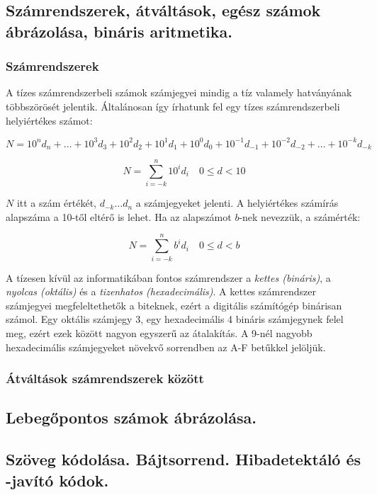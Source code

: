 \documentclass[a4paper]{article}
\begin{document}
\subsection{Számrendszerek, átváltások, egész számok ábrázolása, bináris aritmetika.}

\subsubsection{Számrendszerek}

A tízes számrendszerbeli számok számjegyei mindig a tíz valamely hatványának többszörösét jelentik. Általánosan így írhatunk fel egy tízes számrendszerbeli helyiértékes számot:

$$N = 10^{n} d_n + \dots + 10^3 d_3 + 10^2 d_2 + 10^1 d_1 + 10^0 d_0 + 10^{-1} d_{-1} + 10^{-2} d_{-2} + \dots + 10^{-k} d_{-k}$$

$$N = \sum_{i=-k}^{n} 10^i d_i\quad0 \leq d < 10$$

$N$ itt a szám értékét, $d_{-k} \dots d_n$ a számjegyeket jelenti. A helyiértékes számírás alapszáma a 10-től eltérő is lehet. Ha az alapszámot $b$-nek nevezzük, a számérték:

$$N = \sum_{i=-k}^{n} b^i d_i\quad0 \leq d < b$$

A tízesen kívül az informatikában fontos számrendszer a \emph{kettes (bináris)}, a \emph{nyolcas (oktális)} és a \emph{tizenhatos (hexadecimális)}. A kettes számrendszer számjegyei megfeleltethetők a biteknek, ezért a digitális számítógép binárisan számol. Egy oktális számjegy 3, egy hexadecimális 4 bináris számjegynek felel meg, ezért ezek között nagyon egyszerű az átalakítás. A 9-nél nagyobb hexadecimális számjegyeket növekvő sorrendben az A-F betűkkel jelöljük.

\subsubsection{Átváltások számrendszerek között}

\subsection{Lebegőpontos számok ábrázolása.}

\subsection{Szöveg kódolása. Bájtsorrend. Hibadetektáló és -javító kódok.}
\end{document}
